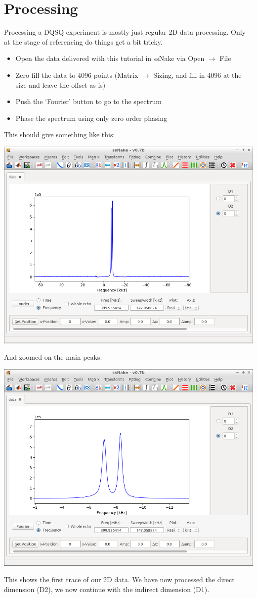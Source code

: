 \documentclass[11pt,a4paper]{article}
\begin{document}
\section{Processing}
Processing a DQSQ experiment is mostly just regular 2D data processing. Only at the stage of
referencing do things get a bit tricky.

\begin{itemize}
  \item Open the data delivered with this tutorial in ssNake via Open $\longrightarrow$ File
	\item Zero fill the data to 4096 points (Matrix $\longrightarrow$ Sizing, and fill in 4096 at the
	  size and leave the offset as is)
	\item Push the `Fourier' button to go to the spectrum
	\item Phase the spectrum using only zero order phasing
\end{itemize}
This should give something like this:
\begin{center}
\includegraphics[width=0.7\linewidth]{Figs/Fig1.png}
\end{center}
And zoomed on the main peaks:
\begin{center}
\includegraphics[width=0.7\linewidth]{Figs/Fig2.png}
\end{center}
This shows the first trace of our 2D data. We have now processed the direct dimension (D2), we now
continue with the indirect dimension (D1).
\end{document}
